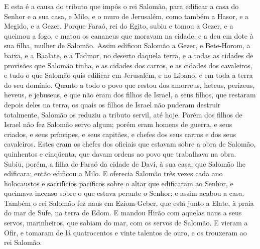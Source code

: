 E esta é a causa do tributo que impôs o rei Salomão, para
edificar a casa do Senhor e a sua casa, e Milo, e o muro de
Jerusalém, como também a Hasor, e a Megido, e a Gezer. Porque
Faraó, rei do Egito, subiu e tomou a Gezer, e a queimou a fogo, e
matou os cananeus que moravam na cidade, e a deu em dote à sua
filha, mulher de Salomão. Assim edificou Salomão a Gezer, e
Bete-Horom, a baixa, e a Baalate, e a Tadmor, no deserto
daquela terra, e a todas as cidades de provisões que Salomão
tinha, e as cidades dos carros, e as cidades dos cavaleiros, e tudo
o que Salomão quis edificar em Jerusalém, e no Líbano, e em toda a
terra do seu domínio. Quanto a todo o povo que restou dos
amorreus, heteus, perizeus, heveus, e jebuseus, e que não eram dos
filhos de Israel, a seus filhos, que restaram depois deles na
terra, os quais os filhos de Israel não puderam destruir totalmente,
Salomão os reduziu a tributo servil, até hoje. Porém dos
filhos de Israel não fez Salomão servo algum; porém eram homens de
guerra, e seus criados, e seus príncipes, e seus capitães, e chefes
dos seus carros e dos seus cavaleiros. Estes eram os chefes
dos oficiais que estavam sobre a obra de Salomão, quinhentos e
cinqüenta, que davam ordens ao povo que trabalhava na obra.
Subiu, porém, a filha de Faraó da cidade de Davi, à sua casa,
que Salomão lhe edificara; então edificou a Milo. E oferecia
Salomão três vezes cada ano holocaustos e sacrifícios pacíficos
sobre o altar que edificaram ao Senhor, e queimava incenso sobre o
que estava perante o Senhor; e assim acabou a casa. Também o
rei Salomão fez naus em Eziom-Geber, que está junto a Elate, à praia
do mar de Sufe, na terra de Edom. E mandou Hirão com aquelas
naus a seus servos, marinheiros, que sabiam do mar, com os servos de
Salomão. E vieram a Ofir, e tomaram de lá quatrocentos e
vinte talentos de ouro, e os trouxeram ao rei Salomão.

\medskip

